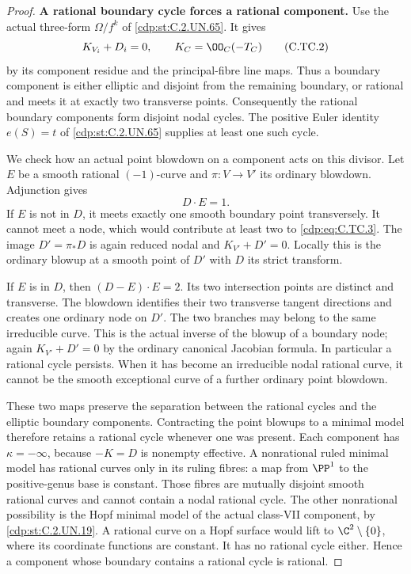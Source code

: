 \begin{proof}
\par\medskip\noindent\textbf{A rational boundary cycle forces a rational component.}
Use the actual three-form $\Omega/f^k$ of \ref{cdp:st:C.2.UN.65}.
It gives
\[
               K_{V_i}+D_i=0,\qquad
               K_C=\OO_C(-T_C)
\tag{C.TC.2}\label{cdp:eq:C.TC.2}
\]
by its component residue and the principal-fibre line maps.
Thus a boundary component is either elliptic and disjoint
from the remaining boundary, or rational and meets it
at exactly two transverse points. Consequently the
rational boundary components form disjoint nodal cycles.
The positive Euler identity $e(S)=t$ of \ref{cdp:st:C.2.UN.65} supplies
at least one such cycle.

We check how an actual point blowdown on a component
acts on this divisor. Let $E$ be a smooth rational
$(-1)$-curve and $\pi:V\to V'$ its ordinary blowdown.
Adjunction gives
\[
                         D\cdot E=1.
\tag{C.TC.3}\label{cdp:eq:C.TC.3}
\]
If $E$ is not in $D$, it meets exactly one smooth
boundary point transversely. It cannot meet a node,
which would contribute at least two to \eqref{cdp:eq:C.TC.3}.
The image $D'=\pi_*D$ is again reduced nodal and
$K_{V'}+D'=0$. Locally this is the ordinary blowup
at a smooth point of $D'$ with $D$ its strict transform.

If $E$ is in $D$, then
$(D-E)\cdot E=2$. Its two intersection points are
distinct and transverse. The blowdown identifies
their two transverse tangent directions and creates
one ordinary node on $D'$. The two branches may
belong to the same irreducible curve. This is the
actual inverse of the blowup of a boundary node;
again $K_{V'}+D'=0$ by the ordinary canonical
Jacobian formula. In particular a rational cycle
persists. When it has become an irreducible nodal
rational curve, it cannot be the smooth exceptional
curve of a further ordinary point blowdown.

These two maps preserve the separation between
the rational cycles and the elliptic boundary
components. Contracting the point blowups to
a minimal model therefore retains a rational
cycle whenever one was present. Each component
has $\kappa=-\infty$, because $-K=D$ is
nonempty effective. A nonrational ruled minimal
model has rational curves only in its ruling
fibres: a map from $\PP^1$ to the positive-genus
base is constant. Those fibres are mutually
disjoint smooth rational curves and cannot
contain a nodal rational cycle. The other
nonrational possibility is the Hopf minimal
model of the actual class-VII component,
by \ref{cdp:st:C.2.UN.19}. A rational curve on a Hopf surface
would lift to $\C^2\setminus\{0\}$, where
its coordinate functions are constant. It
has no rational cycle either. Hence a
component whose boundary contains a rational
cycle is rational.


\end{proof}
